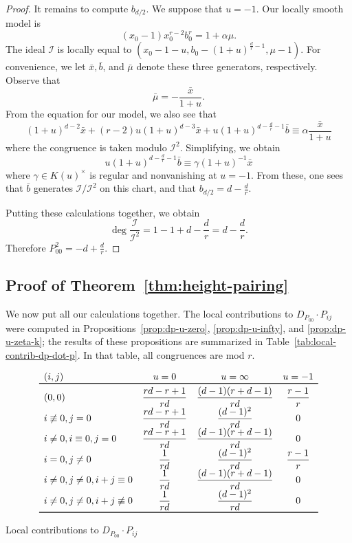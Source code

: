 \documentclass[reqno]{amsart}
\theoremstyle{definition}
\theoremstyle{remark}
\def\II{\mathcal{I}}
\begin{document}
\begin{proof}
It remains to compute $b_{d/2}$. We suppose that $u = -1$. Our locally smooth model is
\[
(x_0 - 1)x_0^{r-2}b_0^r = 1 + \alpha \mu.
\]
The ideal $\II$ is locally equal to $(x_0 - 1 - u, b_0 - (1+u)^{\frac{d}{r} - 1}, \mu - 1)$. For convenience, we let $\bar{x}, \bar{b}$, and $\bar{\mu}$ denote these three generators, respectively. Observe that
\[
\bar{\mu} = -\frac{\bar{x}}{1+u}.
\]
From the equation for our model, we also see that
\[
(1 + u)^{d-2} \bar{x} + (r-2)u(1+u)^{d-3} \bar{x} + u(1+u)^{d - \frac{d}{r} -1} \bar{b} \equiv \alpha \frac{\bar{x}}{1+u}
\]
where the congruence is taken modulo $\II^2$. Simplifying, we obtain
\[
u(1 + u)^{d - \frac{d}{r} - 1} \bar{b} \equiv \gamma(1 + u)^{-1} \bar{x}
\]
where $\gamma \in K(u)^\times$ is regular and nonvanishing at $u = -1$. From these, one sees that $\bar{b}$ generates $\II/\II^2$ on this chart, and that $b_{d/2} = d - \frac{d}{r}$.

Putting these calculations together, we obtain
\[
\deg \frac{\II}{\II^2} = 1 -1 + d - \frac{d}{r} = d - \frac{d}{r}.
\]
Therefore $P_{00}^2 = -d + \frac{d}{r}$.
\end{proof}

\subsection{Proof of Theorem~\ref{thm:height-pairing}}
\label{sec:proof-theor-refthm:h}

We now put all our calculations together. The local contributions to $D_{P_{00}} \cdot P_{ij}$ were computed in Propositions~\ref{prop:dp-u-zero}, \ref{prop:dp-u-infty}, and \ref{prop:dp-u-zeta-k}; the results of these propositions are summarized in Table~\ref{tab:local-contrib-dp-dot-p}. In that table, all congruences are mod $r$.

\renewcommand\arraystretch{2}
\begin{table}[htb]
  \centering
  \[
  \begin{array}[c]{lccc}
    (i,j) & u = 0 & u = \infty & u = -1 \\ \toprule
    (0,0) & \dfrac{rd-r+1}{rd} & \dfrac{(d-1)(r+d-1)}{rd} & \dfrac{r-1}{r} \\
    i \not\equiv 0, j = 0 & \dfrac{rd - r + 1}{rd} & \dfrac{(d-1)^2}{rd} & 0 \\
    i \neq 0, i \equiv 0, j = 0 & \dfrac{rd - r + 1}{rd} & \dfrac{(d-1)(r+d-1)}{rd} & 0 \\
    i = 0, j \neq 0 & \dfrac{1}{rd} & \dfrac{(d-1)^2}{rd} & \dfrac{r-1}{r} \\
    i \neq 0, j \neq 0, i + j \equiv 0 & \dfrac{1}{rd} & \dfrac{(d-1)(r+d-1)}{rd} & 0 \\
    i \neq 0, j \neq 0, i + j \not\equiv 0 & \dfrac{1}{rd} & \dfrac{(d-1)^2}{rd} & 0 \\
    \bottomrule
  \end{array}
  \]
  \caption{Local contributions to $D_{P_{00}} \cdot P_{ij}$}
  \label{tab:local-contrib-dp-dot-p}
\end{table}
\renewcommand\arraystretch{1}
\end{document}
